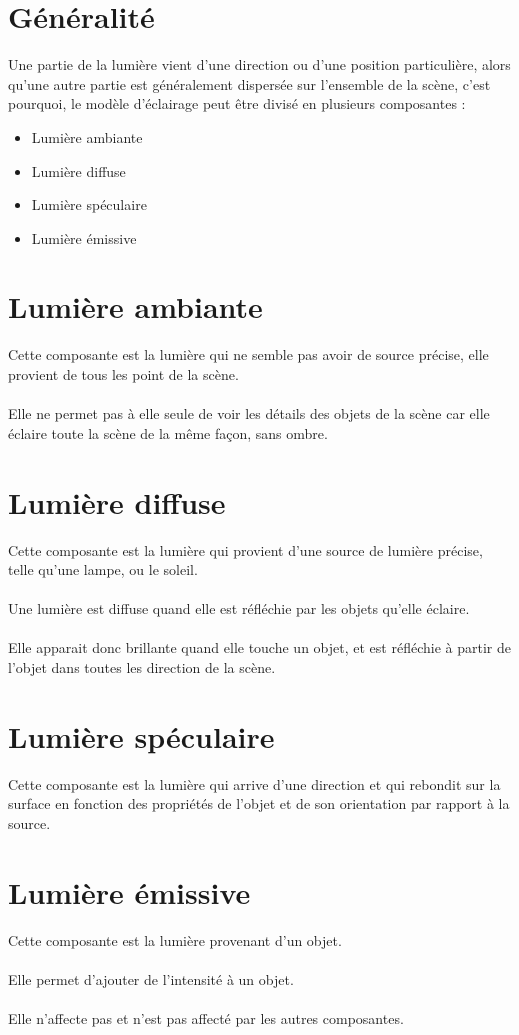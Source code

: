 \section{Généralité}
Une partie de la lumière vient d’une direction ou d’une position particulière, alors
qu’une autre partie est généralement dispersée sur l’ensemble de la scène, c'est pourquoi, le modèle d'éclairage peut être divisé en plusieurs composantes : 
\begin{itemize}
\item Lumière ambiante
\item Lumière diffuse
\item Lumière spéculaire
\item Lumière émissive
\end{itemize}

\section{Lumière ambiante}
Cette composante est la lumière qui ne semble pas avoir de source précise, elle provient de tous les point de la scène.
\\\\
Elle ne permet pas à elle seule de voir les détails des objets de la scène car elle éclaire toute la scène de la même façon, sans ombre.

\section{Lumière diffuse}
Cette composante est la lumière qui provient d'une source de lumière précise, telle qu'une lampe, ou le soleil.
\\\\
Une lumière est diffuse quand elle est réfléchie par les objets qu'elle éclaire.
\\\\
Elle apparait donc brillante quand elle touche un objet, et est réfléchie à partir de l'objet dans toutes les direction de la scène.

\section{Lumière spéculaire}
Cette composante est la lumière qui arrive d'une direction et qui rebondit sur la surface en fonction des propriétés de l'objet et de son orientation par rapport à la source.

\section{Lumière émissive}
Cette composante est la lumière provenant d'un objet.
\\\\
Elle permet d'ajouter de l'intensité à un objet.
\\\\
Elle n'affecte pas et n'est pas affecté par les autres composantes.